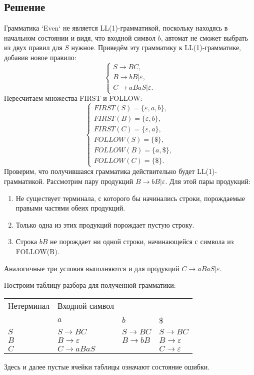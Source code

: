 \documentclass[11pt]{article}
\begin{document}
\subsection{Решение}
\label{sec:org9a9ff93}
Грамматика `Even` не является LL(1)-грамматикой, поскольку находясь в начальном состоянии и видя,
что входной символ \(b\), автомат не сможет выбрать из двух правил для \(S\) нужное. Приведём эту
грамматику к LL(1)-грамматике, добавив новое правило:
\begin{equation}
\begin{cases}
S \rightarrow BC, \\
B \rightarrow bB | \varepsilon, \\
C \rightarrow aBaS | \varepsilon.
\end{cases}
\end{equation}
Пересчитаем множества FIRST и FOLLOW:
\begin{equation*}
\begin{cases}
FIRST(S) = \{\varepsilon, a, b\}, \\
FIRST(B) = \{\varepsilon, b\}, \\
FIRST(C) = \{\varepsilon, a\}, \\
FOLLOW(S) = \{\$\}, \\
FOLLOW(B) = \{a, \$\}, \\
FOLLOW(C) = \{\$\}.
\end{cases}
\end{equation*}
Проверим, что получившаяся грамматика действительно будет LL(1)-грамматикой. Рассмотрим пару
продукций \(B \rightarrow bB | \varepsilon\). Для этой пары продукций:
\begin{enumerate}
\item Не существует терминала, с которого бы начинались строки, порождаемые правыми частями обеих продукций.
\item Только одна из этих продукций порождает пустую строку.
\item Строка \(bB\) не порождает ни одной строки, начинающейся с символа из FOLLOW(B).
\end{enumerate}
Аналогичные три условия выполняются и для продукций \(C \rightarrow aBaS | \varepsilon\).

Построим таблицу разбора для полученной грамматики:
\begin{center}
\begin{tabular}{llll}
\hline
Нетерминал & Входной символ &  & \\
 & \(a\) & \(b\) & \$\\
\hline
\(S\) & \(S \rightarrow BC\) & \(S \rightarrow BC\) & \(S \rightarrow BC\)\\
\(B\) & \(B \rightarrow \varepsilon\) & \(B \rightarrow bB\) & \(B \rightarrow \varepsilon\)\\
\(C\) & \(C \rightarrow aBaS\) &  & \(C \rightarrow \varepsilon\)\\
\hline
\end{tabular}
\end{center}
Здесь и далее пустые ячейки таблицы означают состояние ошибки.
\end{document}
